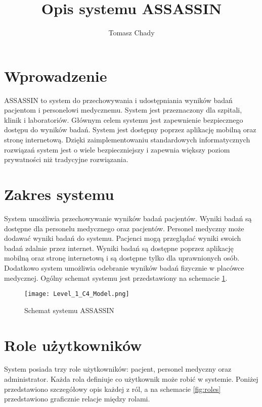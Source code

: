 \documentclass{documentation}
\title{Opis systemu ASSASSIN}
\author{Tomasz Chady}
\begin{document}
\maketitle

\section{Wprowadzenie}

ASSASSIN to system do przechowywania i udostępniania wyników badań pacjentom i personelowi medycznemu.
System jest przeznaczony dla szpitali, klinik i laboratoriów.
Głównym celem systemu jest zapewnienie bezpiecznego dostępu do wyników badań.
System jest dostępny poprzez aplikację mobilną oraz stronę internetową.
Dzięki zaimplementowaniu standardowych informatycznych rozwiązań system jest o wiele bezpieczniejszy i zapewnia większy poziom prywatności niż tradycyjne rozwiązania.

\section{Zakres systemu}

System umożliwia przechowywanie wyników badań pacjentów.
Wyniki badań są dostępne dla personelu medycznego oraz pacjentów.
Personel medyczny może dodawać wyniki badań do systemu.
Pacjenci mogą przeglądać wyniki swoich badań zdalnie przez internet.
Wyniki badań są dostępne poprzez aplikację mobilną oraz stronę internetową i są dostępne tylko dla uprawnionych osób.
Dodatkowo system umożliwia odebranie wyników badań fizycznie w placówce medycznej.
Ogólny schemat systemu jest przedstawiony na schemacie \ref{fig:system}.

\begin{figure}[h!]
    \centering
    \texttt{[image: Level\_1\_C4\_Model.png]}
    \caption{Schemat systemu ASSASSIN\label{fig:system}}
\end{figure}

\section{Role użytkowników}

System posiada trzy role użytkowników: pacjent, personel medyczny oraz administrator.
Każda rola definiuje co użytkownik może robić w systemie.
Poniżej przedstawiono szczegółowy opis każdej z ról, a na schemacie \ref{fig:roles} przedstawiono graficznie relacje między rolami.
\end{document}
